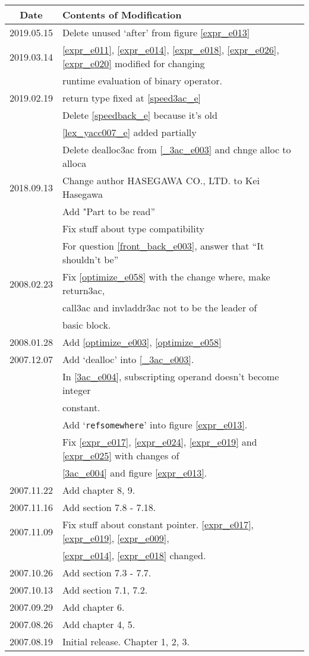 \begin{tabular}{|c|l|} \hline
  Date &  Contents of Modification \\ \hline
  2019.05.15 & Delete unused `after' from figure \ref{expr_e013} \\ \hline
  2019.03.14 & \ref{expr_e011}, \ref{expr_e014}, \ref{expr_e018}, \ref{expr_e026}, \ref{expr_e020} modified for changing \\
  & runtime evaluation of binary operator. \\ \hline
2019.02.19 & return type fixed at \ref{speed3ac_e} \\
           & Delete \ref{speedback_e} because it's old \\
& \ref{lex_yacc007_e} added partially \\
 & Delete dealloc3ac from \ref{_3ac_e003} and chnge alloc to alloca \\ \hline
2018.09.13 & Change author HASEGAWA CO., LTD. to Kei Hasegawa \\
           & Add "Part to be read'' \\
& Fix stuff about type compatibility \\
& For question \ref{front_back_e003}, answer that ``It shouldn't be'' \\
\hline
2008.02.23 & Fix \ref{optimize_e058} with the change where, make
           return3ac, \\
           & call3ac  and invladdr3ac not to be the leader of \\
           & basic block. \\ \hline
2008.01.28 & Add \ref{optimize_e003}, \ref{optimize_e058} \\ \hline
2007.12.07 & Add `dealloc' into \ref{_3ac_e003}. \\
           & In \ref{3ac_e004}, subscripting operand doesn't become integer \\
           & constant. \\
           & Add `{\tt{refsomewhere}}' into figure \ref{expr_e013}. \\
           & Fix \ref{expr_e017}, \ref{expr_e024}, \ref{expr_e019}
             and \ref{expr_e025} with changes of \\
           &  \ref{3ac_e004} and figure \ref{expr_e013}. \\ \hline
2007.11.22 & Add chapter 8, 9. \\ \hline
2007.11.16 & Add section 7.8 - 7.18. \\ \hline
2007.11.09 & Fix stuff about constant pointer. \ref{expr_e017},
             \ref{expr_e019}, \ref{expr_e009}, \\
           & \ref{expr_e014}, \ref{expr_e018} changed. \\ \hline
2007.10.26 & Add section 7.3 - 7.7. \\ \hline
2007.10.13 & Add section 7.1, 7.2. \\ \hline
2007.09.29 & Add chapter 6. \\ \hline
2007.08.26 & Add chapter 4, 5. \\ \hline
2007.08.19 & Initial release. Chapter 1, 2, 3. \\ \hline
\end{tabular}
